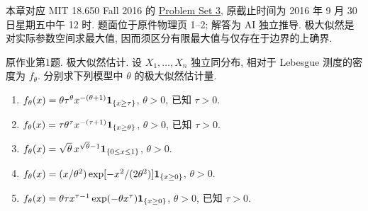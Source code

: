 \label{chap:ps03}
本章对应 MIT 18.650 Fall 2016 的 \href{https://ocw.mit.edu/courses/18-650-statistics-for-applications-fall-2016/resources/problem-set-3/}{Problem Set 3}, 原截止时间为 2016 年 9 月 30 日星期五中午 12 时. 题面位于原件物理页 1--2; 解答为 AI 独立推导. 极大似然是对实际参数空间求最大值, 因而须区分有限最大值与仅存在于边界的上确界.

\begin{exercise}\label{ps03:p01}
原作业第1题. 极大似然估计. 设 $X_1,\ldots,X_n$ 独立同分布, 相对于 Lebesgue 测度的密度为 $f_\theta$. 分别求下列模型中 $\theta$ 的极大似然估计量.
\begin{enumerate}[label=\arabic*.]
\item $f_\theta(x)=\theta\tau^\theta x^{-(\theta+1)}\mathbf 1_{\{x\ge\tau\}}$, $\theta>0$, 已知 $\tau>0$.
\item $f_\theta(x)=\tau\theta^\tau x^{-(\tau+1)}\mathbf 1_{\{x\ge\theta\}}$, $\theta>0$, 已知 $\tau>0$.
\item $f_\theta(x)=\sqrt\theta\,x^{\sqrt\theta-1}\mathbf 1_{\{0\le x\le1\}}$, $\theta>0$.
\item $f_\theta(x)=(x/\theta^2)\exp[-x^2/(2\theta^2)]\mathbf 1_{\{x\ge0\}}$, $\theta>0$.
\item $f_\theta(x)=\theta\tau x^{\tau-1}\exp(-\theta x^\tau)\mathbf 1_{\{x\ge0\}}$, $\theta>0$, 已知 $\tau>0$.
\end{enumerate}
\end{exercise}
